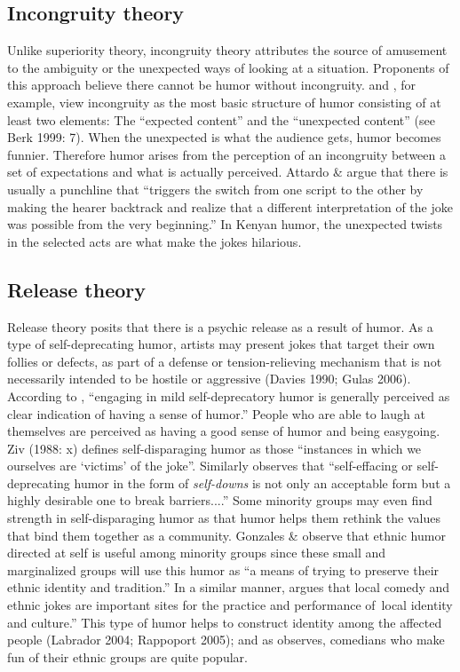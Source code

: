 \documentclass[output=paper]{langsci/langscibook}
\begin{document}
\subsection{Incongruity theory}

   Unlike superiority theory, incongruity theory attributes the source of amusement to the ambiguity or the unexpected ways of looking at a situation. Proponents of this approach believe there cannot be humor without incongruity. \citet{Berk1999} and \citet{Caroll2014}, for example, view incongruity as the most basic structure of humor consisting of at least two elements: The “expected content” and the “unexpected content” (see Berk 1999: 7). When the unexpected is what the audience gets, humor becomes funnier. Therefore humor arises from the perception of an incongruity between a set of expectations and what is actually perceived. Attardo \& \citet[308]{Raskin1999} argue that there is usually a punchline that “triggers the switch from one script to the other by making the hearer backtrack and realize that a different interpretation of the joke was possible from the very beginning.” In Kenyan humor, the unexpected twists in the selected acts are what make the jokes hilarious. 

\subsection{Release theory}

   Release theory posits that there is a psychic release as a result of humor. As a type of self-deprecating humor, artists may present jokes that target their own follies or defects, as part of a defense or tension-relieving mechanism that is not necessarily intended to be hostile or aggressive (Davies 1990; Gulas 2006). According to \citet[30]{Apte1987}, “engaging in mild self-deprecatory humor is generally perceived as clear indication of having a sense of humor.” People who are able to laugh at themselves are perceived as having a good sense of humor and being easygoing. Ziv (1988: x) defines self-disparaging humor as those “instances in which we ourselves are ‘victims’ of the joke”. Similarly \citet[12]{Berk1999} observes that “self-effacing or self-deprecating humor in the form of \textit{self-downs} is not only an acceptable form but a highly desirable one to break barriers....” Some minority groups may even find strength in self-disparaging humor as that humor helps them rethink the values that bind them together as a community. Gonzales \& \citet[172]{Wiseman2005} observe that ethnic humor directed at self is useful among minority groups since these small and marginalized groups will use this humor as “a means of trying to preserve their ethnic identity and tradition.” In a similar manner, \citet[298]{Labrador2004} argues that {local comedy and ethnic jokes are important sites for the practice and performance of~local identity and culture.” }This type of humor helps to construct identity among the affected people (Labrador 2004; Rappoport 2005); and as \citet[36]{Apte1987} observes, comedians who make fun of their ethnic groups are quite popular. 
\end{document}
